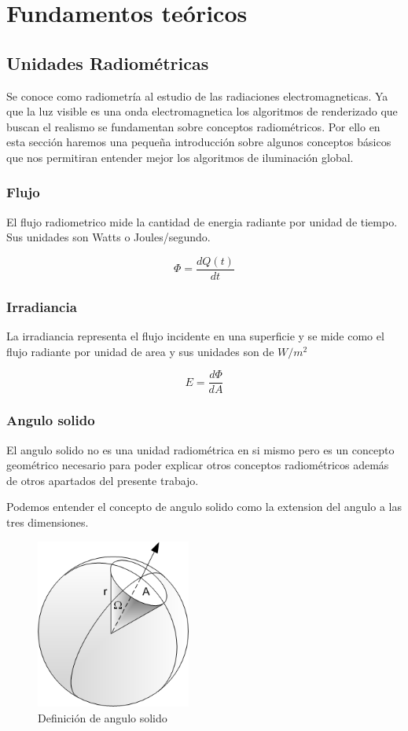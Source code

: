 \chapter{Fundamentos teóricos}

\section{Unidades Radiométricas}
Se conoce como radiometría al estudio de las radiaciones electromagneticas. Ya que la luz visible es una onda electromagnetica los algoritmos de renderizado que buscan el realismo se fundamentan sobre conceptos radiométricos. Por ello en esta sección haremos una pequeña introducción sobre algunos conceptos básicos que nos permitiran entender mejor los algoritmos de iluminación global.  
\subsection{Flujo}

El flujo radiometrico mide la cantidad de energia radiante por unidad de tiempo. Sus unidades son Watts o Joules/segundo.

\begin{equation}
\Phi = \frac{dQ(t)}{dt}
\end{equation}

\subsection{Irradiancia}
La irradiancia representa el flujo incidente en una superficie y se mide como el flujo radiante por unidad de area y sus unidades son de $W/m^2$ 

\begin{equation}
E = \frac{d\Phi}{dA}
\end{equation}

\clearpage

\subsection{Angulo solido}
El angulo solido no es una unidad radiométrica en si mismo pero es un concepto geométrico necesario para poder explicar otros conceptos radiométricos además de otros apartados del presente trabajo.

Podemos entender el concepto de angulo solido como la extension del angulo a las tres dimensiones.
\begin{figure}[h]
\centering
\includegraphics[width=2in]{Solid_Angle.png}
\caption{Definición de angulo solido \cite{Haade}}
\end{figure}

